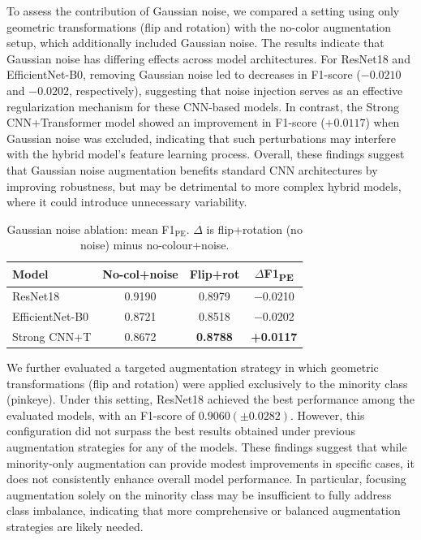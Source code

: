 \documentclass[preprint,12pt,authoryear]{elsarticle}
\begin{document}
To assess the contribution of Gaussian noise, we compared a setting using only geometric transformations (flip and rotation) with the no-color augmentation setup, which additionally included Gaussian noise. The results indicate that Gaussian noise has differing effects across model architectures. For ResNet18 and EfficientNet-B0, removing Gaussian noise led to decreases in F1-score ($-0.0210$ and $-0.0202$, respectively), suggesting that noise injection serves as an effective regularization mechanism for these CNN-based models. In contrast, the Strong CNN+Transformer model showed an improvement in F1-score ($+0.0117$) when Gaussian noise was excluded, indicating that such perturbations may interfere with the hybrid model's feature learning process. Overall, these findings suggest that Gaussian noise augmentation benefits standard CNN architectures by improving robustness, but may be detrimental to more complex hybrid models, where it could introduce unnecessary variability.

\begin{table}
  \caption{Gaussian noise ablation: mean F1$_{\mathrm{PE}}$.
    $\Delta$ is flip+rotation (no noise) minus no-colour+noise.}
  \label{tab:ablation_noise}
  \centering
  \begin{tabular}{lccc}
    \toprule
    \textbf{Model}
      & \textbf{No-col+noise}
      & \textbf{Flip+rot}
      & \textbf{$\Delta$F1\textsubscript{PE}} \\
    \midrule
    ResNet18          & 0.9190 & 0.8979 & $-$0.0210 \\
    EfficientNet-B0   & 0.8721 & 0.8518 & $-$0.0202 \\
    Strong CNN+T      & 0.8672 & \textbf{0.8788} & \textbf{+0.0117} \\
    \bottomrule
  \end{tabular}
\end{table}

We further evaluated a targeted augmentation strategy in which geometric transformations (flip and rotation) were applied exclusively to the minority class (pinkeye). Under this setting, ResNet18 achieved the best performance among the evaluated models, with an F1-score of $0.9060 (\pm 0.0282)$. However, this configuration did not surpass the best results obtained under previous augmentation strategies for any of the models. These findings suggest that while minority-only augmentation can provide modest improvements in specific cases, it does not consistently enhance overall model performance. In particular, focusing augmentation solely on the minority class may be insufficient to fully address class imbalance, indicating that more comprehensive or balanced augmentation strategies are likely needed.
\end{document}
